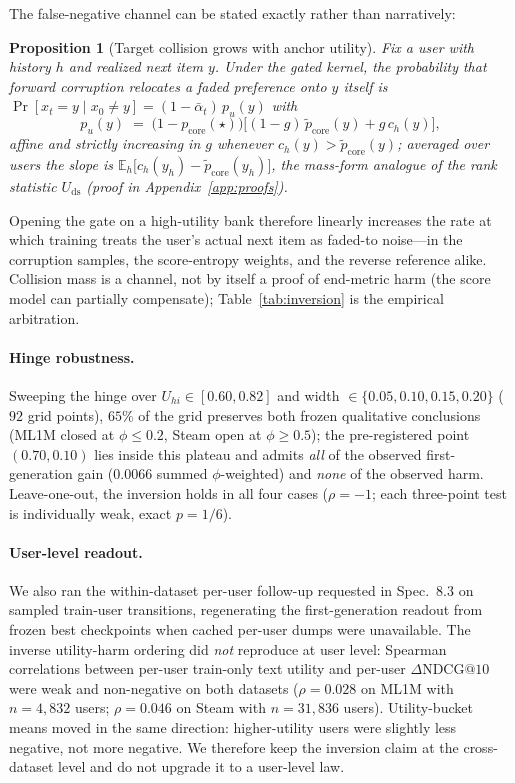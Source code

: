 \documentclass[letterpaper]{article}
\newcommand{\pcore}{p_{\mathrm{core}}}
\newcommand{\pcorer}{\tilde{p}_{\mathrm{core}}}
\newcommand{\ch}{c_{h}}
\newcommand{\pu}{p_{u}}
\newcommand{\Uds}{U_{\mathrm{ds}}}
\newtheorem{proposition}{Proposition}
\begin{document}
The false-negative channel can be stated exactly rather than
narratively:
\begin{proposition}[Target collision grows with anchor utility]
\label{prop:collision}
Fix a user with history $h$ and realized next item $y$. Under the
gated kernel, the probability that forward corruption relocates a
faded preference onto $y$ itself is
$\Pr[x_t{=}y \mid x_0{\ne}y] = (1-\bar\alpha_t)\,\pu(y)$ with
\[
\pu(y) \;=\; \big(1-\pcore(\star)\big)\big[(1-g)\,\pcorer(y) +
g\,\ch(y)\big],
\]
affine and strictly increasing in $g$ whenever $\ch(y)>\pcorer(y)$;
averaged over users the slope is
$\mathbb{E}_h\!\big[\ch(y_h)-\pcorer(y_h)\big]$, the mass-form analogue
of the rank statistic $\Uds$ (proof in Appendix~\ref{app:proofs}).
\end{proposition}
Opening the gate on a high-utility bank therefore linearly increases
the rate at which training treats the user's actual next item as
faded-to noise---in the corruption samples, the score-entropy weights,
and the reverse reference alike. Collision mass is a channel, not by
itself a proof of end-metric harm (the score model can partially
compensate); Table~\ref{tab:inversion} is the empirical arbitration.

\paragraph{Hinge robustness.}
Sweeping the hinge over $U_{hi}\in[0.60,0.82]$ and width
$\in\{0.05,0.10,0.15,0.20\}$ ($92$ grid points), $65\%$ of the grid
preserves both frozen qualitative conclusions (ML1M closed at
$\phi\le0.2$, Steam open at $\phi\ge0.5$); the pre-registered point
$(0.70,0.10)$ lies inside this plateau and admits \emph{all} of the
observed first-generation gain ($0.0066$ summed
$\phi$-weighted) and \emph{none} of the observed harm. Leave-one-out,
the inversion holds in all four cases ($\rho=-1$; each three-point
test is individually weak, exact $p=1/6$).

\paragraph{User-level readout.}
We also ran the within-dataset per-user follow-up requested in
Spec.~8.3 on sampled train-user transitions, regenerating the
first-generation readout from frozen best checkpoints when cached
per-user dumps were unavailable. The inverse utility-harm ordering did
\emph{not} reproduce at user level: Spearman correlations between
per-user train-only text utility and per-user
$\Delta\mathrm{NDCG}@10$ were weak and non-negative on both datasets
($\rho=0.028$ on ML1M with $n=4{,}832$ users; $\rho=0.046$ on Steam
with $n=31{,}836$ users). Utility-bucket means moved in the same
direction: higher-utility users were slightly less negative, not more
negative. We therefore keep the inversion claim at the cross-dataset
level and do not upgrade it to a user-level law.
\end{document}
